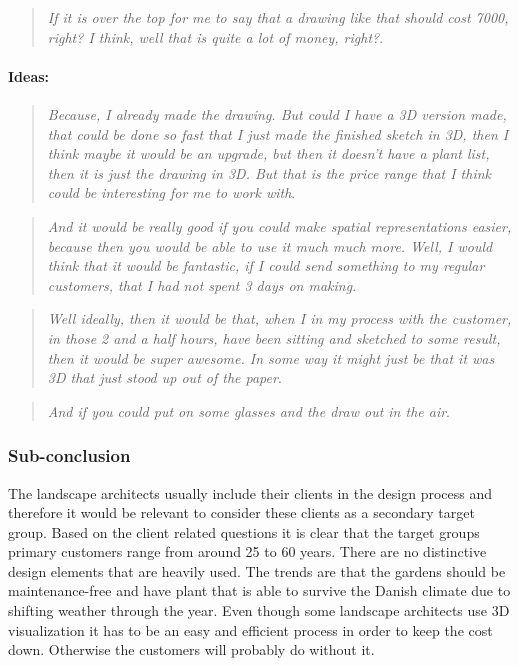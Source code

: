 		\begin{quote}
			\textit{If it is over the top for me to say that a drawing like that should cost 7000, right? I think, well that is quite a lot of money, right?}\label{quote:expertRessources4}.\\
		\end{quote}
		
		\paragraph*{Ideas:}
		\begin{quote}
			\textit{Because, I already made the drawing. But could I have a 3D version made, that could be done so fast that I just made the finished sketch in 3D, then I think maybe it would be an upgrade, but then it doesn't have a plant list, then it is just the drawing in 3D. But that is the price range that I think could be interesting for me to work with}\label{quote:expertIdeas1}.\\
		\end{quote}
		
		\begin{quote}
			\textit{And it would be really good if you could make spatial representations easier, because then you would be able to use it much much more. Well, I would think that it would be fantastic, if I could send something to my regular customers, that I had not spent 3 days on making}\label{quote:expertIdeas2}.\\
		\end{quote}
	
		\begin{quote}
			\textit{Well ideally, then it would be that, when I in my process with the customer, in those 2 and a half hours, have been sitting and sketched to some result, then it would be super awesome. In some way it might just be that it was 3D that just stood up out of the paper}\label{quote:expertIdeas3}.\\
		\end{quote}
		
		\begin{quote}
			\textit{And if you could put on some glasses and the draw out in the air}\label{quote:expertIdeas4}.\\
		\end{quote}
		
		\subsubsection{Sub-conclusion}
		The landscape architects usually include their clients in the design process and therefore it would be relevant to consider these clients as a secondary target group. Based on the client related questions it is clear that the target groups primary customers range from around 25 to 60 years. There are no distinctive design elements that are heavily used. The trends are that the gardens should be maintenance-free and have plant that is able to survive the Danish climate due to shifting weather through the year.
		Even though some landscape architects use 3D visualization it has to be an easy and efficient process in order to keep the cost down. Otherwise the customers will probably do without it.
		
